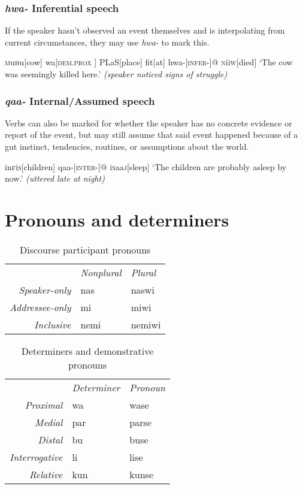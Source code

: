 \documentclass[a4paper,10pt,twoside,openright]{memoir}
\newcommand{\famwordold}[5]{#1\textsc{#2}#3\textsc{#4}#5}
\begin{document}
\subsubsection{\emph{hwa-} Inferential speech}

If the speaker hasn't observed an event themselves and is interpolating from current circumstances, they may use \emph{hwa-} to mark this. 

\ex
\begingl
\famwordold{}{m}{u}{h}{u}[cow]
wa[\textsc{dem.prox
}]
\famwordold{}{PL}{a}{S}{}[place]
fit[at]
hwa-[\textsc{infer-}]@
\famwordold{}{n}{ii}{w}{}[died]
\glft `The cow was seemingly killed here.' \textit{(speaker noticed signs of struggle)}
\endgl
\xe

\subsubsection{\emph{qaa-} Internal/Assumed speech}

Verbs can also be marked for whether the speaker has no concrete evidence or report of the event, but may still assume that said event happened because of a gut instinct, tendencies, routines, or assumptions about the world.

\ex
\begingl
\famwordold{in}{f}{i}{s}{}[children]
qaa-[\textsc{inter-}]@
\famwordold{i}{s}{aa}{j}{}[sleep]
\glft `The children are probably asleep by now.' \textit{(uttered late at night)}
\endgl
\xe

\newpage
\section{Pronouns and determiners}

\begin{table}[ht]
    \centering
    \begin{tabular}{rll}
        & \textit{Nonplural} & \textit{Plural} \\
    \textit{Speaker-only} & nas & naswi \\
    \textit{Addressee-only} & mi & miwi \\
    \textit{Inclusive} & nemi & nemiwi \\
    \end{tabular}
    \caption{Discourse participant pronouns}
    \label{tab:firstandsecond}
\end{table}

\begin{table}[ht]
    \centering
    \begin{tabular}{>{\em}rll}
        & \textit{Determiner} & \textit{Pronoun}  \\
    Proximal & wa & wase \\
    Medial & par & parse \\
    Distal & bu & buse \\
    Interrogative & li & lise \\
    Relative & kun & kunse 
    \end{tabular}
    \caption{Determiners and demonstrative pronouns}
    \label{tab:determiners}
\end{table}
\end{document}
